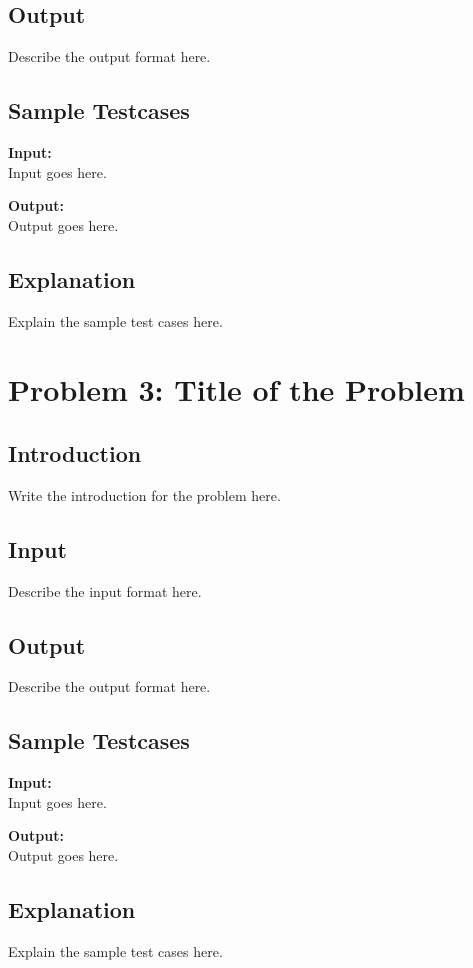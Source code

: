 \documentclass[12pt]{article}
\begin{document}
\subsection*{Output}
Describe the output format here.

\subsection*{Sample Testcases}
\textbf{Input:} \\
Input goes here.

\textbf{Output:} \\
Output goes here.

\subsection*{Explanation}
Explain the sample test cases here.

\newpage

\section*{Problem 3: Title of the Problem}

\subsection*{Introduction}
Write the introduction for the problem here.

\subsection*{Input}
Describe the input format here.

\subsection*{Output}
Describe the output format here.

\subsection*{Sample Testcases}
\textbf{Input:} \\
Input goes here.

\textbf{Output:} \\
Output goes here.

\subsection*{Explanation}
Explain the sample test cases here.
\end{document}
